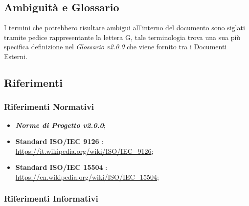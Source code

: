 \subsection{Ambiguità e Glossario}
I termini che potrebbero risultare ambigui all'interno del documento sono siglati tramite pedice rappresentante la lettera \textmd{G}, tale terminologia trova una sua più specifica definizione nel \textit{Glossario v2.0.0} che viene fornito tra i Documenti Esterni.

\subsection{Riferimenti}
\label{riferimenti}
\subsubsection{Riferimenti Normativi}

	\begin{itemize}
		\item \textbf{\textit{Norme di Progetto v2.0.0}};
		\item \textbf{Standard ISO/IEC 9126} : \\ \url{https://it.wikipedia.org/wiki/ISO/IEC_9126};
		\item \textbf{Standard ISO/IEC 15504} : \\ \url{https://en.wikipedia.org/wiki/ISO/IEC_15504};
	\end{itemize}


\subsubsection{Riferimenti Informativi}

